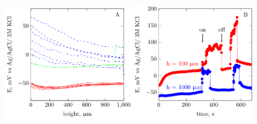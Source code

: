\documentclass[3p]{elsarticle}
\begin{document}
\begin{figure}
\centering
\includegraphics[width=0.5\textwidth]{field-figure0.pdf}\includegraphics[width=0.466\textwidth]{field-figure1.pdf}

\end{figure}
\end{document}
